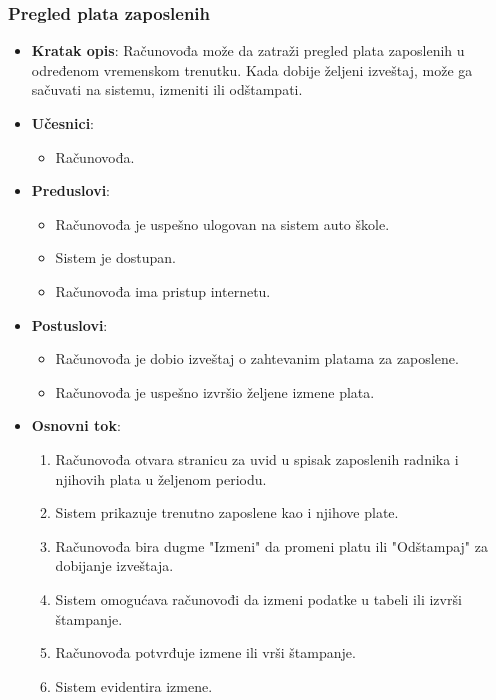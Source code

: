 \subsubsection{Pregled plata zaposlenih}
\label{subsubsec:vozni park}
\begin{itemize}
  \item \textbf{Kratak opis}: Računovođa može da zatraži pregled plata zaposlenih u određenom vremenskom trenutku. Kada dobije željeni izveštaj, 
  može ga sačuvati na sistemu, izmeniti ili odštampati.

  \item \textbf{Učesnici}:
    \begin{itemize}
    \item Računovođa.
    \end{itemize}
  \item \textbf{Preduslovi}:
    \begin{itemize}
    \item  Računovođa je uspešno ulogovan na sistem auto škole.
    \item  Sistem je dostupan.
    \item  Računovođa ima pristup internetu.
    \end{itemize}
  \item \textbf{Postuslovi}:
      \begin{itemize}
      \item  Računovođa je dobio izveštaj o zahtevanim platama za zaposlene.
      \item  Računovođa je uspešno izvršio željene izmene plata.
      \end{itemize}
  \item \textbf{Osnovni tok}:
      \begin{enumerate}
        \item Računovođa otvara stranicu za uvid u spisak zaposlenih radnika i njihovih plata u željenom periodu.
        \item Sistem prikazuje trenutno zaposlene kao i njihove plate.
        \item Računovođa bira dugme "Izmeni" da promeni platu ili  "Odštampaj" za dobijanje izveštaja.
        \item Sistem omogućava računovođi da izmeni podatke u tabeli  ili  izvrši štampanje.
        \item Računovođa potvrđuje izmene ili vrši štampanje.
        \item Sistem evidentira izmene.
      \end{enumerate}


\end{itemize}
